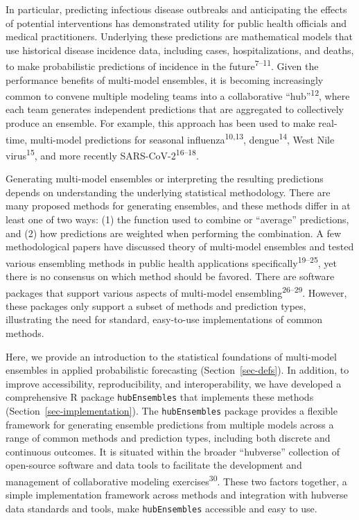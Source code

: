 \documentclass[
]{article}
\begin{document}
In particular, predicting infectious disease outbreaks and anticipating
the effects of potential interventions has demonstrated utility for
public health officials and medical practitioners. Underlying these
predictions are mathematical models that use historical disease
incidence data, including cases, hospitalizations, and deaths, to make
probabilistic predictions of incidence in the
future\textsuperscript{7--11}. Given the performance benefits of
multi-model ensembles, it is becoming increasingly common to convene
multiple modeling teams into a collaborative
``hub''\textsuperscript{12}, where each team generates independent
predictions that are aggregated to collectively produce an ensemble. For
example, this approach has been used to make real-time, multi-model
predictions for seasonal influenza\textsuperscript{10,13},
dengue\textsuperscript{14}, West Nile virus\textsuperscript{15}, and
more recently SARS-CoV-2\textsuperscript{16--18}.

Generating multi-model ensembles or interpreting the resulting
predictions depends on understanding the underlying statistical
methodology. There are many proposed methods for generating ensembles,
and these methods differ in at least one of two ways: (1) the function
used to combine or ``average'' predictions, and (2) how predictions are
weighted when performing the combination. A few methodological papers
have discussed theory of multi-model ensembles and tested various
ensembling methods in public health applications
specifically\textsuperscript{19--25}, yet there is no consensus on which
method should be favored. There are software packages that support
various aspects of multi-model ensembling\textsuperscript{26--29}.
However, these packages only support a subset of methods and prediction
types, illustrating the need for standard, easy-to-use implementations
of common methods.

Here, we provide an introduction to the statistical foundations of
multi-model ensembles in applied probabilistic forecasting
(Section~\ref{sec-defs}). In addition, to improve accessibility,
reproducibility, and interoperability, we have developed a comprehensive
R package \texttt{hubEnsembles} that implements these methods
(Section~\ref{sec-implementation}). The \texttt{hubEnsembles} package
provides a flexible framework for generating ensemble predictions from
multiple models across a range of common methods and prediction types,
including both discrete and continuous outcomes. It is situated within
the broader ``hubverse'' collection of open-source software and data
tools to facilitate the development and management of collaborative
modeling exercises\textsuperscript{30}. These two factors together, a
simple implementation framework across methods and integration with
hubverse data standards and tools, make \texttt{hubEnsembles} accessible
and easy to use.
\end{document}

